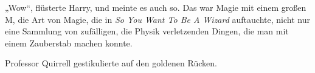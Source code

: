 „Wow“, flüsterte Harry, und meinte es auch so. Das war Magie mit einem großen M, die Art von Magie, die in \emph{So You Want To Be A Wizard} auftauchte, nicht nur eine Sammlung von zufälligen, die Physik verletzenden Dingen, die man mit einem Zauberstab machen konnte.

Professor Quirrell gestikulierte auf den goldenen Rücken.
